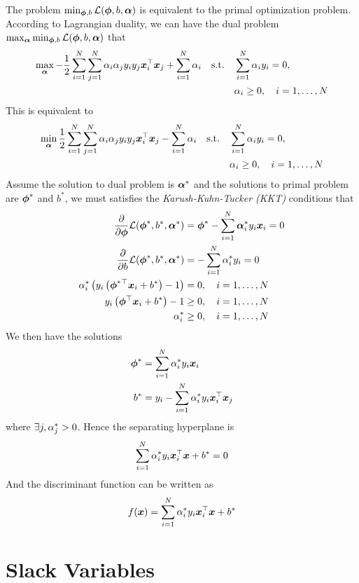 The problem $\min_{\boldsymbol{\phi},b}\mathcal{L}(\boldsymbol{\phi},b,\boldsymbol{\alpha})$ is equivalent to the primal optimization problem. According to Lagrangian duality, we can have the dual problem $\max_{\boldsymbol{\alpha}}\min_{\boldsymbol{\phi},b}\mathcal{L}(\boldsymbol{\phi},b,\boldsymbol{\alpha})$ that
\begin{align*}
	\max_{\boldsymbol{\alpha}}-\frac{1}{2}\sum_{i=1}^N\sum_{j=1}^N\alpha_i\alpha_jy_iy_j\boldsymbol{x}_i^\top\boldsymbol{x}_j+\sum_{i=1}^N\alpha_i\quad\text{s.t.}\quad&\sum_{i=1}^N\alpha_iy_i=0, \\
	&\alpha_i\geq 0,\quad i=1,\dotsc,N
\end{align*}
This is equivalent to
\begin{align*}
	\min_{\boldsymbol{\alpha}}\frac{1}{2}\sum_{i=1}^N\sum_{j=1}^N\alpha_i\alpha_jy_iy_j\boldsymbol{x}_i^\top\boldsymbol{x}_j-\sum_{i=1}^N\alpha_i\quad\text{s.t.}\quad&\sum_{i=1}^N\alpha_iy_i=0, \\
	&\alpha_i\geq 0,\quad i=1,\dotsc,N
\end{align*}
Assume the solution to dual problem is $\boldsymbol{\alpha}^*$ and the solutions to primal problem are $\boldsymbol{\phi}^*$ and $b^*$, we must satisfies the \emph{Karush-Kuhn-Tucker (KKT)} conditions that
\begin{align*}
	\frac{\partial}{\partial\boldsymbol{\phi}}\mathcal{L}(\boldsymbol{\phi}^*,b^*,\boldsymbol{\alpha}^*)&=\boldsymbol{\phi}^*-\sum_{i=1}^N\boldsymbol{\alpha}_i^*y_i\boldsymbol{x}_i=0 \\
	\frac{\partial}{\partial b}\mathcal{L}(\boldsymbol{\phi}^*,b^*,\boldsymbol{\alpha}^*)&=-\sum_{i=1}^N\alpha_i^*y_i=0 \\
	\alpha_i^*\left(y_i\left(\boldsymbol{\phi}^*{}^\top\boldsymbol{x}_i+b^*\right)-1\right)&=0,\quad i=1,\dotsc,N \\
	y_i\left(\boldsymbol{\phi}{}^\top\boldsymbol{x}_i+b^*\right)-1&\geq 0,\quad i=1,\dotsc,N \\
	\alpha_i^*&\geq 0,\quad i=1,\dotsc,N
\end{align*}
We then have the solutions
\begin{align*}
	\boldsymbol{\phi}^*&=\sum_{i=1}^N\alpha_i^*y_i\boldsymbol{x}_i \\
	b^*&=y_i-\sum_{i=1}^N\alpha_i^*y_i\boldsymbol{x}_i^\top\boldsymbol{x}_j
\end{align*}
where $\exists j,\alpha_j^*>0$. Hence the separating hyperplane is
\begin{align*}
	\sum_{i=1}^N\alpha_i^*y_i\boldsymbol{x}_i^\top\boldsymbol{x}+b^*=0
\end{align*}
And the discriminant function can be written as
\begin{align*}
	f(\boldsymbol{x})=\sum_{i=1}^N\alpha_i^*y_i\boldsymbol{x}_i^\top\boldsymbol{x}+b^*
\end{align*}



\section{Slack Variables}
\label{section8.3}

